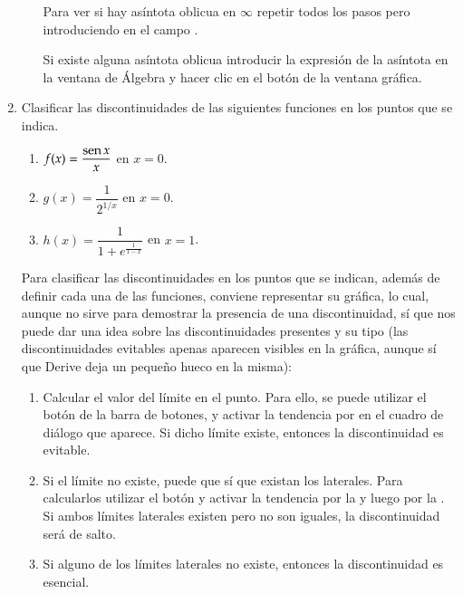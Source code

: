 \begin{enumerate}[leftmargin=*]
\begin{enumerate}
\begin{indicacion}
Para ver si hay asíntota oblicua en $\infty$ repetir todos los pasos pero introduciendo  en el campo .
 
Si existe alguna asíntota oblicua introducir la expresión de la asíntota en la ventana de Álgebra y hacer clic en el botón  de la ventana gráfica.
\end{indicacion}
\end{enumerate}

\item  Clasificar las discontinuidades de las siguientes funciones en los puntos que se indica.
\begin{multicols}{2}
\begin{enumerate}
\item  $f(x)=\dfrac{\operatorname{sen} x}{x}$ en $x=0$.
\item $g(x)=\dfrac{1}{2^{1/x}}$ en $x=0$.
\item $h(x)=\dfrac{1}{1+e^{\frac{1}{1-x}}}$ en $x=1$.
\end{enumerate}
\end{multicols}

\begin{indicacion}
Para clasificar las discontinuidades en los puntos que se indican, además de definir cada una de las funciones, conviene representar su
gráfica, lo cual, aunque no sirve para demostrar la presencia de una discontinuidad, sí que nos puede dar una idea sobre las
discontinuidades presentes y su tipo (las discontinuidades evitables apenas aparecen visibles en la gráfica, aunque sí que Derive deja un
pequeño hueco en la misma):
\begin{enumerate}
\item Calcular el valor del límite en el punto. Para ello, se puede utilizar el botón  de la barra de botones, y
activar la tendencia por  en el cuadro de diálogo que aparece. Si dicho límite existe, entonces la discontinuidad es evitable.
\item Si el límite no existe, puede que sí que existan los laterales. Para calcularlos utilizar el botón  y
activar la tendencia por la  y luego por la . Si ambos límites laterales existen pero no son iguales, la
discontinuidad será de salto.
\item Si alguno de los límites laterales no existe, entonces la discontinuidad es esencial.
\end{enumerate}
\end{indicacion}



\end{enumerate}

